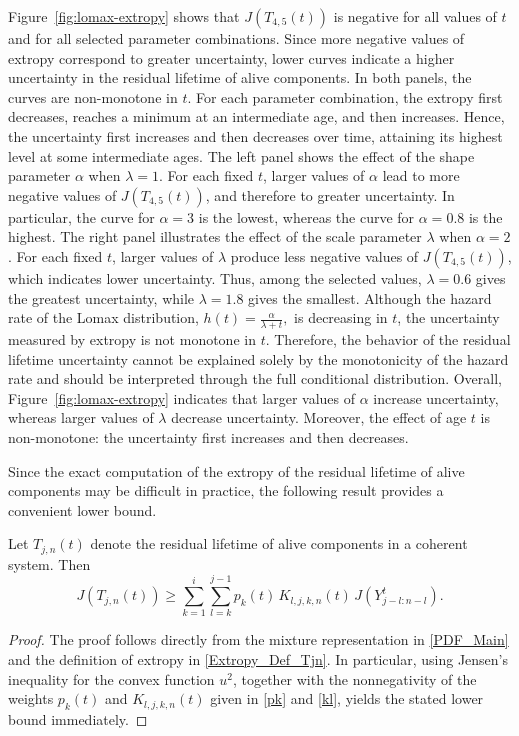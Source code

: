 \documentclass[twoside]{article}
\begin{document}
\begin{eg}
\begin{figure}[ht]
\end{figure}
Figure~\ref{fig:lomax-extropy} shows that \(J(T_{4,5}(t))\) is negative for all values of \(t\) and for all selected parameter combinations. Since more negative values of extropy correspond to greater uncertainty, lower curves indicate a higher uncertainty in the residual lifetime of alive components.
In both panels, the curves are non-monotone in \(t\). For each parameter combination, the extropy first decreases, reaches a minimum at an intermediate age, and then increases. Hence, the uncertainty first increases and then decreases over time, attaining its highest level at some intermediate ages.
The left panel shows the effect of the shape parameter \(\alpha\) when \(\lambda=1\). For each fixed \(t\), larger values of \(\alpha\) lead to more negative values of \(J(T_{4,5}(t))\), and therefore to greater uncertainty. In particular, the curve for \(\alpha=3\) is the lowest, whereas the curve for \(\alpha=0.8\) is the highest.
The right panel illustrates the effect of the scale parameter \(\lambda\) when \(\alpha=2\). For each fixed \(t\), larger values of \(\lambda\) produce less negative values of \(J(T_{4,5}(t))\), which indicates lower uncertainty. Thus, among the selected values, \(\lambda=0.6\) gives the greatest uncertainty, while \(\lambda=1.8\) gives the smallest.
Although the hazard rate of the Lomax distribution,
$
h(t)=\frac{\alpha}{\lambda+t},
$
is decreasing in \(t\), the uncertainty measured by extropy is not monotone in \(t\). Therefore, the behavior of the residual lifetime uncertainty cannot be explained solely by the monotonicity of the hazard rate and should be interpreted through the full conditional distribution.
Overall, Figure~\ref{fig:lomax-extropy} indicates that larger values of \(\alpha\) increase uncertainty, whereas larger values of \(\lambda\) decrease uncertainty. Moreover, the effect of age \(t\) is non-monotone: the uncertainty first increases and then decreases.
\end{eg}

Since the exact computation of the extropy of the residual lifetime of alive components may be difficult in practice, the following result provides a convenient lower bound.

\begin{thm}\label{th1}
Let $T_{j,n}(t)$ denote the residual lifetime of alive components in a coherent system. Then
\begin{equation}
J(T_{j,n}(t)) \geq \sum_{k=1}^{i}\sum_{l=k}^{j-1} p_k(t)\,K_{l,j,k,n}(t)\,J\!\left(Y^t_{j-l:n-l}\right).
\end{equation}
\end{thm}
\begin{proof}
The proof follows directly from the mixture representation in \eqref{PDF_Main} and the definition of extropy in \eqref{Extropy_Def_Tjn}. 
In particular, using Jensen's inequality for the convex function \(u^2\), together with the nonnegativity of the weights \(p_k(t)\) and \(K_{l,j,k,n}(t)\) given in \eqref{pk} and \eqref{kl}, yields the stated lower bound immediately.
\end{proof}
\end{document}
